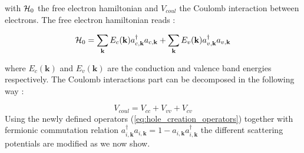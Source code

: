\noindent with $\mathcal{H}_0$ the free electron hamiltonian and $V_{coul}$ the Coulomb interaction between electrons. The free electron hamiltonian reads :

\begin{equation}
    \mathcal{H}_0 = \sum_{\mathbf{k}} E_c(\mathbf{k}) a^{\dagger}_{c,\mathbf{k}}a_{c,\mathbf{k}}+\sum_{\mathbf{k}} E_v(\mathbf{k}) a^{\dagger}_{v,\mathbf{k}}a_{v,\mathbf{k}}
    \label{eq:free_electron_hamiltonian}
\end{equation}

\noindent where $E_c(\mathbf{k})$ and $E_v(\mathbf{k})$ are the conduction and valence band energies respectively. The Coulomb interactions part can be decomposed in the following way :

\begin{equation}
    V_{coul} = V_{cc} + V_{vv} + V_{cv}
    \label{eq:Coulomb_interaction}
\end{equation}
Using the newly defined operators (\ref{eq:hole_creation_operators}) together with fermionic commutation relation $a^{\dagger}_{i,\textbf{k}}a_{i,\textbf{k}}= 1-a_{i,\textbf{k}}a^{\dagger}_{i,\textbf{k}} $ the different scattering potentials are modified as we now show. 

